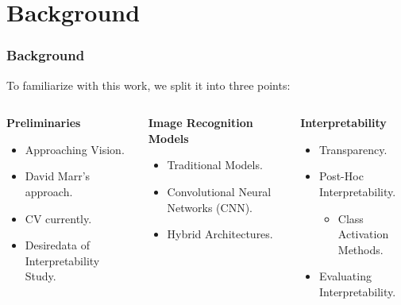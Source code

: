 \section{Background}
\begin{frame}[t]
    \frametitle{Background}
    To familiarize with this work, we split it into three points:\\\pause
    \begin{columns}[t]
        \begin{center}
            \footnotesize\textbf{Preliminaries}\\
            \begin{itemize}
                \footnotesize\item Approaching Vision.
                \footnotesize\item David Marr's approach.
                \footnotesize\item CV currently.
                \footnotesize\item Desiredata of Interpretability Study.
            \end{itemize}
        \end{center}
        \begin{center}
            \footnotesize\textbf{Image Recognition Models}\\
            \begin{itemize}
                \footnotesize\item Traditional Models.
                \footnotesize\item Convolutional Neural Networks (CNN).
                \footnotesize\item Hybrid Architectures.
            \end{itemize}
        \end{center}
        \begin{center}
            \footnotesize\textbf{Interpretability}\\
            \begin{itemize}
                \footnotesize\item Transparency.
                \footnotesize\item Post-Hoc Interpretability.
                \begin{itemize}
                    \footnotesize\item Class Activation Methods.
                \end{itemize}
                \footnotesize\item Evaluating Interpretability.
            \end{itemize}
        \end{center}
    \end{columns}            
\end{frame}


